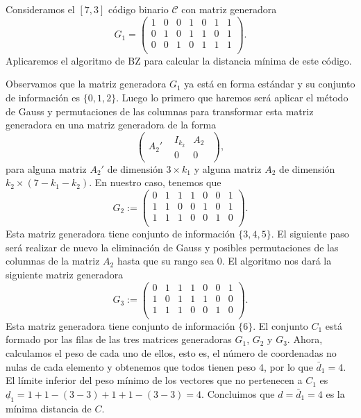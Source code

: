 \begin{exampleth}
    Consideramos el $[7, 3]$ código binario $\mathcal{C}$ con matriz generadora 
    \[
        G_1 = \left( 
            \begin{array}{ccc|cccc}
                1 & 0 & 0 & 1 & 0 & 1 & 1 \\ 
                0 & 1 & 0 & 1 & 1 & 0 & 1 \\ 
                0 & 0 & 1 & 0 & 1 & 1 & 1 \\ 
            \end{array}
            \right) .
    \]
    Aplicaremos el algoritmo de BZ para calcular la distancia mínima de este código.

    Observamos que la matriz generadora $G_1$ ya está en forma estándar y su conjunto de información es $\{ 0,1,2 \}$. Luego lo primero que haremos será aplicar el método de Gauss y permutaciones de las columnas para transformar esta matriz generadora en una matriz generadora de la forma
    \[
        \left( \begin{array}{c|c} A_{2}' & \begin{array}{c|c} I_{k_{2}} & A_{2} \\ \hline  0 & 0 \end{array} \end{array} \right),
    \]
    para alguna matriz $A_2'$ de dimensión $3 \times k_1$ y alguna matriz $A_2$ de dimensión $k_2 \times (7 - k_1 - k_2)$. En nuestro caso, tenemos que
    \[
        G_2 := \left( 
            \begin{array}{ccc|ccc|c}
                0 & 1 & 1 & 1 & 0 & 0 & 1 \\ 
                1 & 1 & 0 & 0 & 1 & 0 & 1 \\ 
                1 & 1 & 1 & 0 & 0 & 1 & 0 \\ 
            \end{array}
            \right) .
    \]
    Esta matriz generadora tiene conjunto de información $\{3,4,5\}$. El siguiente paso será realizar de nuevo la eliminación de Gauss y posibles permutaciones de las columnas de la matriz $A_2$ hasta que su rango sea $0$. El algoritmo nos dará la siguiente matriz generadora
    \[
        G_3 := \left( 
            \begin{array}{cccccc|c}
                0 & 1 & 1 & 1 & 0 & 0 & 1 \\ 
                1 & 0 & 1 & 1 & 1 & 0 & 0 \\ 
                1 & 1 & 1 & 0 & 0 & 1 & 0 \\ 
            \end{array}
            \right) .
    \]
    Esta matriz generadora tiene conjunto de información $\{6\}$. El conjunto $C_1$ está formado por las filas de las tres matrices generadoras $G_1$, $G_2$ y $G_3$. Ahora, calculamos el peso de cada uno de ellos, esto es, el número de coordenadas no nulas de cada elemento y obtenemos que todos tienen peso $4$, por lo que $\bar{d}_1 = 4$. El límite inferior del peso mínimo de los vectores que no pertenecen a $C_1$ es $\underline{d}_1 = 1 + 1 - (3-3) + 1 + 1 - (3-3) = 4$. Concluimos que $d = \bar{d}_1 = 4$ es la mínima distancia de $C$.
\end{exampleth}

